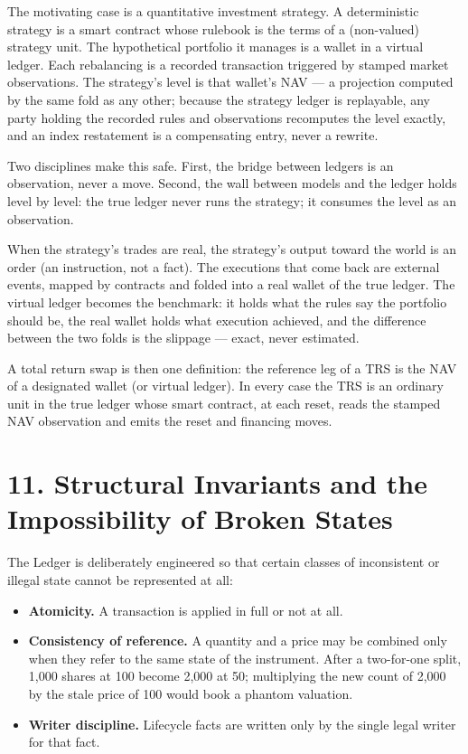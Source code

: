 \documentclass[11pt,a4paper]{article}
\providecommand{\tightlist}{\setlength{\itemsep}{2pt}\setlength{\parskip}{0pt}}
\begin{document}
The motivating case is a quantitative investment strategy. A
deterministic strategy is a smart contract whose rulebook is the terms
of a (non-valued) strategy unit. The hypothetical portfolio it manages
is a wallet in a virtual ledger. Each rebalancing is a recorded
transaction triggered by stamped market observations. The strategy's
level is that wallet's NAV --- a projection computed by the same fold as
any other; because the strategy ledger is replayable, any party holding
the recorded rules and observations recomputes the level exactly, and an
index restatement is a compensating entry, never a rewrite.

Two disciplines make this safe. First, the bridge between ledgers is an
observation, never a move. Second, the wall between models and the
ledger holds level by level: the true ledger never runs the strategy; it
consumes the level as an observation.

When the strategy's trades are real, the strategy's output toward the
world is an order (an instruction, not a fact). The executions that come
back are external events, mapped by contracts and folded into a real
wallet of the true ledger. The virtual ledger becomes the benchmark: it
holds what the rules say the portfolio should be, the real wallet holds
what execution achieved, and the difference between the two folds is the
slippage --- exact, never estimated.

A total return swap is then one definition: the reference leg of a TRS
is the NAV of a designated wallet (or virtual ledger). In every case the
TRS is an ordinary unit in the true ledger whose smart contract, at each
reset, reads the stamped NAV observation and emits the reset and
financing moves.

\hypertarget{structural-invariants-and-the-impossibility-of-broken-states}{%
\section{11. Structural Invariants and the Impossibility of Broken
States}\label{structural-invariants-and-the-impossibility-of-broken-states}}

The Ledger is deliberately engineered so that certain classes of
inconsistent or illegal state cannot be represented at all:

\begin{itemize}
\tightlist
\item
  \textbf{Atomicity.} A transaction is applied in full or not at all.
\item
  \textbf{Consistency of reference.} A quantity and a price may be
  combined only when they refer to the same state of the instrument.
  After a two-for-one split, 1,000 shares at 100 become 2,000 at 50;
  multiplying the new count of 2,000 by the stale price of 100 would
  book a phantom valuation.
\item
  \textbf{Writer discipline.} Lifecycle facts are written only by the
  single legal writer for that fact.
\end{itemize}
\end{document}
